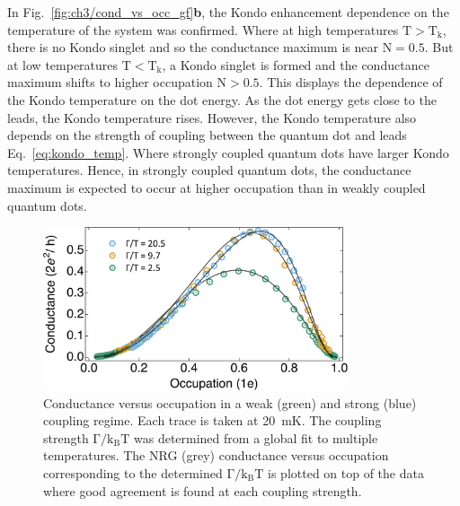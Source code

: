 In Fig.~\ref{fig:ch3/cond_vs_occ_gf}\textbf{b}, the Kondo enhancement dependence on the temperature of the system was confirmed. Where at high temperatures $\mathrm{T>T_k}$, there is no Kondo singlet and so the conductance maximum is near $\mathrm{N} = 0.5$. But at low temperatures $\mathrm{T<T_k}$, a Kondo singlet is formed and the conductance maximum shifts to higher occupation $\mathrm{N} > 0.5$. This displays the dependence of the Kondo temperature on the dot energy. As the dot energy gets close to the leads, the Kondo temperature rises. However, the Kondo temperature also depends on the strength of coupling between the quantum dot and leads Eq.~\ref{eq:kondo_temp}. Where strongly coupled quantum dots have larger Kondo temperatures. Hence, in strongly coupled quantum dots, the conductance maximum is expected to occur at higher occupation than in weakly coupled quantum dots. 


\begin{figure}[!bht]
 \begin{center}
 \includegraphics[width=0.8\textwidth]{figures/ch3/crop_FiguresMaster.015.png}
 \caption[Conductance vs. Occupation : Varying the coupling strength between the quantum dot and leads]{\label{fig:ch3/cond_occ_couplingstrength} 
 Conductance versus occupation in a weak (green) and strong (blue) coupling regime. Each trace is taken at \qty{20}{mK}. The coupling strength $\mathrm{\Gamma/k_BT}$ was determined from a global fit to multiple temperatures. The NRG (grey) conductance versus occupation corresponding to the determined $\mathrm{\Gamma/k_BT}$ is plotted on top of the data where good agreement is found at each coupling strength.}
 \end{center}
\end{figure}


